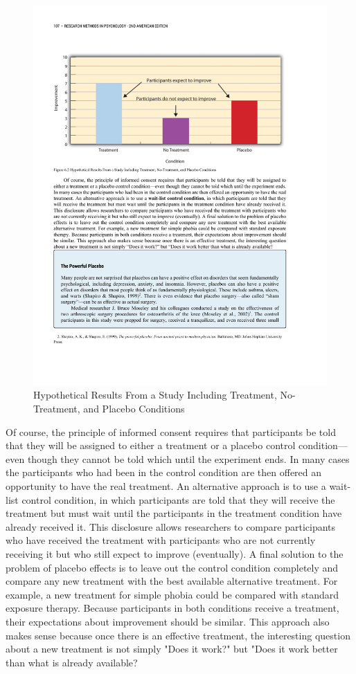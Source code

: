 \begin{figure}
\includegraphics[width=\linewidth]{figures/C6placebo.pdf}
\caption{Hypothetical Results From a Study Including Treatment, No-Treatment, and Placebo Conditions
}
\label{fig:placebo}
\end{figure}

Of course, the principle of informed consent requires that participants be told that they will be assigned to either a treatment or a placebo control condition---even though they cannot be told which until the experiment ends. In many cases the participants who had been in the control condition are then offered an opportunity to have the real treatment. An alternative approach is to use a wait-list control condition, in which participants are told that they will receive the treatment but must wait until the participants in the treatment condition have already received it. This disclosure allows researchers to compare participants who have received the treatment with participants who are not currently receiving it but who still expect to improve (eventually). A final solution to the problem of placebo effects is to leave out the control condition completely and compare any new treatment with the best available alternative treatment. For example, a new treatment for simple phobia could be compared with standard exposure therapy. Because participants in both conditions receive a treatment, their expectations about improvement should be similar. This approach also makes sense because once there is an effective treatment, the interesting question about a new treatment is not simply "Does it work?" but "Does it work better than what is already available?

